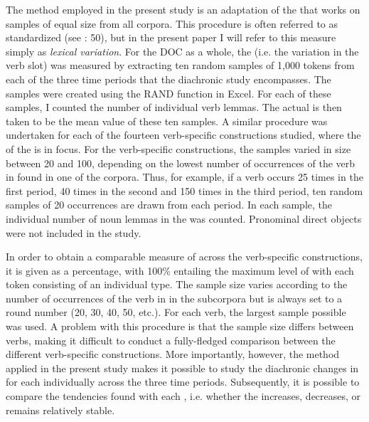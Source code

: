 \documentclass[output=paper]{langscibook}
\begin{document}
The method employed in the present study is an adaptation of the  that works on samples of equal size from all corpora. This procedure is often referred to as standardized  (see \citealt{McEneryHardie2012}: 50), but in the present paper I will refer to this measure simply as \textit{lexical variation}. For the DOC as a whole, the  (i.e. the variation in the verb slot) was measured by extracting ten random samples of 1,000 tokens from each of the three time periods that the diachronic study encompasses. The samples were created using the RAND function in Excel. For each of these samples, I counted the number of individual verb lemmas. The actual  is then taken to be the mean value of these ten samples. A similar procedure was undertaken for each of the fourteen verb-specific constructions studied, where the  of the  is in focus. For the verb-specific constructions, the samples varied in size between 20 and 100, depending on the lowest number of occurrences of the verb in  found in one of the corpora. Thus, for example, if a verb occurs 25 times in the first period, 40 times in the second and 150 times in the third period, ten random samples of 20 occurrences are drawn from each period. In each sample, the individual number of noun lemmas in the  was counted. Pronominal direct objects were not included in the study.



In order to obtain a comparable measure of  across the verb-specific constructions, it is given as a percentage, with 100\% entailing the maximum level of  with each token consisting of an individual type. The sample size varies according to the number of occurrences of the verb in  in the subcorpora but is always set to a round number (20, 30, 40, 50, etc.). For each verb, the largest sample possible was used. A problem with this procedure is that the sample size differs between verbs, making it difficult to conduct a fully-fledged comparison between the different verb-specific constructions. More importantly, however, the method applied in the present study makes it possible to study the diachronic changes in  for each  individually across the three time periods. Subsequently, it is possible to compare the tendencies found with each , i.e. whether the  increases, decreases, or remains relatively stable.
\end{document}
